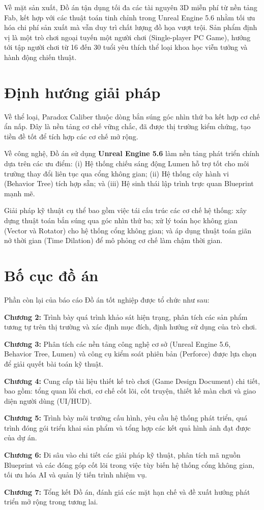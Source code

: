 \documentclass[../DoAn.tex]{subfiles}
\begin{document}
Về mặt sản xuất, Đồ án tận dụng tối đa các tài nguyên 3D miễn phí từ nền tảng Fab, kết hợp với các thuật toán tinh chỉnh trong Unreal Engine 5.6 nhằm tối ưu hóa chi phí sản xuất mà vẫn duy trì chất lượng đồ họa vượt trội. Sản phẩm định vị là một trò chơi ngoại tuyến một người chơi (Single-player PC Game), hướng tới tập người chơi từ 16 đến 30 tuổi yêu thích thể loại khoa học viễn tưởng và hành động chiến thuật.

\section{Định hướng giải pháp}
\label{section:1.3}

Về thể loại, Paradox Caliber thuộc dòng bắn súng góc nhìn thứ ba kết hợp cơ chế ẩn nấp. Đây là nền tảng cơ chế vững chắc, đã được thị trường kiểm chứng, tạo tiền đề tốt để tích hợp các cơ chế mở rộng.

Về công nghệ, Đồ án sử dụng \textbf{Unreal Engine 5.6} \cite{UE56Doc} làm nền tảng phát triển chính dựa trên các ưu điểm: (i) Hệ thống chiếu sáng động Lumen hỗ trợ tốt cho môi trường thay đổi liên tục qua cổng không gian; (ii) Hệ thống cây hành vi (Behavior Tree) tích hợp sẵn; và (iii) Hệ sinh thái lập trình trực quan Blueprint mạnh mẽ.

Giải pháp kỹ thuật cụ thể bao gồm việc tái cấu trúc các cơ chế hệ thống: xây dựng thuật toán bắn súng qua góc nhìn thứ ba; xử lý toán học không gian (Vector và Rotator) cho hệ thống cổng không gian; và áp dụng thuật toán giãn nở thời gian (Time Dilation) để mô phỏng cơ chế làm chậm thời gian.

\section{Bố cục đồ án}
\label{section:1.4}
Phần còn lại của báo cáo Đồ án tốt nghiệp được tổ chức như sau:

\textbf{Chương 2:} Trình bày quá trình khảo sát hiện trạng, phân tích các sản phẩm tương tự trên thị trường và xác định mục đích, định hướng sử dụng của trò chơi.

\textbf{Chương 3:} Phân tích các nền tảng công nghệ cơ sở (Unreal Engine 5.6, Behavior Tree, Lumen) và công cụ kiểm soát phiên bản (Perforce) được lựa chọn để giải quyết bài toán kỹ thuật.

\textbf{Chương 4:} Cung cấp tài liệu thiết kế trò chơi (Game Design Document) chi tiết, bao gồm: tổng quan lối chơi, cơ chế cốt lõi, cốt truyện, thiết kế màn chơi và giao diện người dùng (UI/HUD).

\textbf{Chương 5:} Trình bày môi trường cấu hình, yêu cầu hệ thống phát triển, quá trình đóng gói triển khai sản phẩm và tổng hợp các kết quả hình ảnh đạt được của dự án.

\textbf{Chương 6:} Đi sâu vào chi tiết các giải pháp kỹ thuật, phân tích mã nguồn Blueprint và các đóng góp cốt lõi trong việc tùy biến hệ thống cổng không gian, tối ưu hóa AI và quản lý tiến trình nhiệm vụ.

\textbf{Chương 7:} Tổng kết Đồ án, đánh giá các mặt hạn chế và đề xuất hướng phát triển mở rộng trong tương lai.
\end{document}
